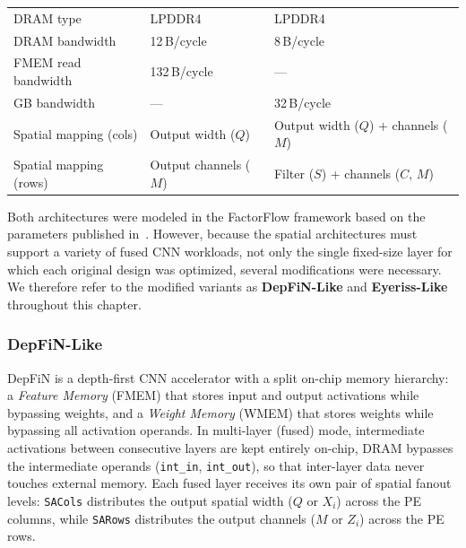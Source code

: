 \begin{table}[htbp]
\begin{tabular}{l l l}
    \addlinespace
    DRAM type                    & LPDDR4                               & LPDDR4                              \\
    DRAM bandwidth               & 12\,B/cycle                          & 8\,B/cycle                          \\
    FMEM read bandwidth          & 132\,B/cycle                         & ---                                 \\
    GB bandwidth                 & ---                                  & 32\,B/cycle                         \\
    \addlinespace
    Spatial mapping (cols)       & Output width ($Q$)                   & Output width ($Q$) + channels ($M$) \\
    Spatial mapping (rows)       & Output channels ($M$)                & Filter ($S$) + channels ($C$, $M$)  \\
    \bottomrule
  \end{tabular}
\end{table}

Both architectures were modeled in the FactorFlow framework based on the
parameters published in~\cite{goetschalckx2023depfin,eyeriss}.
However, because the spatial architectures must support a variety of fused CNN
workloads, not only the single fixed-size layer for which each original design
was optimized, several modifications were necessary.
We therefore refer to the modified variants as \textbf{DepFiN-Like} and
\textbf{Eyeriss-Like} throughout this chapter.

\subsubsection{DepFiN-Like}
\label{sec:depfin-like}

DepFiN is a depth-first CNN accelerator with a split on-chip memory
hierarchy: a \emph{Feature Memory} (FMEM) that stores input and output
activations while bypassing weights, and a \emph{Weight Memory} (WMEM) that
stores weights while bypassing all activation operands.
In multi-layer (fused) mode, intermediate activations between consecutive
layers are kept entirely on-chip, DRAM bypasses the intermediate operands
(\texttt{int\_in}, \texttt{int\_out}), so that inter-layer data never touches external memory.
Each fused layer receives its own pair of spatial fanout levels:
\texttt{SACols} distributes the output spatial width ($Q$ or $X_i$) across
the PE columns, while \texttt{SARows} distributes the output channels
($M$ or $Z_i$) across the PE rows.

